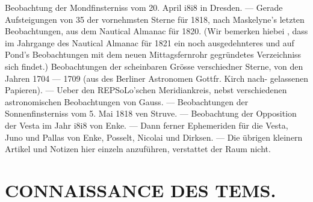 \documentclass[12pt,a4paper]{article}
\begin{document}
{{{{{{{{Beobachtung  der  Mondfinsterniss vom  20.  April  i8i8  in  Dresden.  ---  Gerade  Aufsteigungen  von  35  der  vornehmsten  Sterne  für  1818,  nach Maskelyne's  letzten  Beobachtungen,  aus  dem  Nautical  Almanac  für  1820.  (Wir  bemerken  hiebei ,  dass im  Jahrgange  des  Nautical  Almanac  für  1821  ein  noch  ausgedehnteres  und  auf  Pond's  Beobachtungen mit  dem  neuen  Mittagsfernrohr  gegründetes  Verzeichniss  sich  findet.)  Beobachtungen  der  scheinbaren Grösse  verschiedner  Sterne,  von  den  Jahren  1704 --- 1709  (aus  des  Berliner  Astronomen  Gottfr.  Kirch  nach- gelassenen Papieren).  ---  Ueber  den  REPSoLo'schen  Meridiankreis,  nebst  verschiedenen  astronomischen Beobachtungen  von  Gauss.  ---  Beobachtungen  der  Sonnenfinsterniss  vom  5.  Mai  1818  ven  Struve.  --- Beobachtung  der  Opposition  der  Vesta  im  Jahr  i8i8  von  Enke.  ---  Dann  ferner  Ephemeriden  für  die Vesta,  Juno  und  Pallas  von  Enke,  Posselt,  Nicolai  und  Dirksen.  ---  Die  übrigen  kleinern  Artikel  und Notizen  hier  einzeln  anzuführen,  verstattet  der  Raum  nicht.


\section*{CONNAISSANCE  DES  TEMS.}

}}}}}}}}
\end{document}
